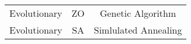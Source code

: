 \documentclass[twoside,a4paper,10pt]{article}
\begin{document}
\begin{tabular}{|p{3cm}|c|c|}
\hline
Evolutionary & ZO & Genetic Algorithm\\ 
Evolutionary & SA & Simlulated Annealing \\ 
\hline
\end{tabular}
\end{document}
